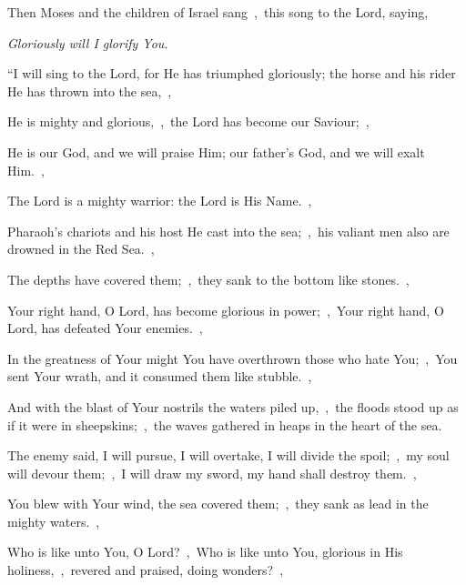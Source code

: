 \documentclass[12pt,twoside,a5paper]{article}
\begin{document}



\begin{normalparskip}
   Then Moses and the children of Israel sang~\sep\ this song to the Lord, saying,


   \emph{Gloriously will I glorify You.}

  ``I will sing to the Lord, for He has triumphed gloriously; the horse and his rider He has thrown into the sea,~\sep

  He is mighty and glorious,~\sep\ the Lord has become our Saviour;~\sep

  He is our God, and we will praise Him; our father's God, and we will exalt Him.~\sep

  The Lord is a mighty warrior: the Lord is His Name.~\sep

  Pharaoh's chariots and his host He cast into the sea;~\sep\ his valiant men also are drowned in the Red Sea.~\sep

  The depths have covered them;~\sep\ they sank to the bottom like stones.~\sep

  Your right hand, O Lord, has become glorious in power;~\sep\ Your right hand, O Lord, has defeated Your enemies.~\sep

  In the greatness of Your might You have overthrown those who hate You;~\sep\ You sent Your wrath, and it consumed them like stubble.~\sep

  And with the blast of Your nostrils the waters piled up,~\sep\ the floods stood up as if it were in sheepskins;~\sep\ the waves gathered in heaps in the heart of the sea.

  The enemy said, I will pursue, I will overtake, I will divide the spoil;~\sep\ my soul will devour them;~\sep\ I will draw my sword, my hand shall destroy them.~\sep

  You blew with Your wind, the sea covered them;~\sep\ they sank as lead in the mighty waters.~\sep

  Who is like unto You, O Lord?~\sep\ Who is like unto You, glorious in His holiness,~\sep\ revered and praised, doing wonders?~\sep


\end{normalparskip}
\end{document}
